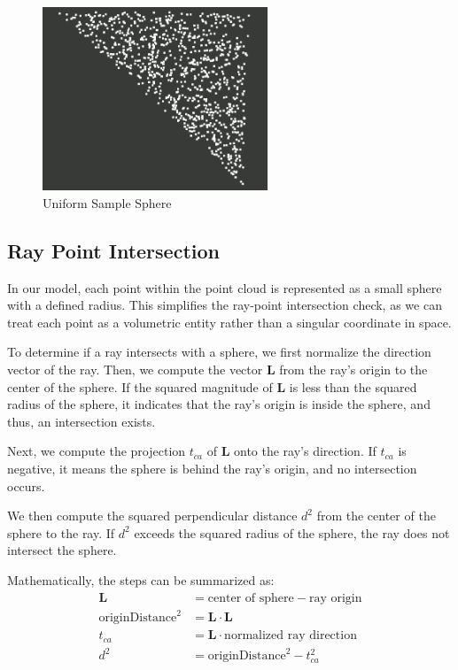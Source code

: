 \documentclass[11pt, a4paper,oneside,chapterprefix=false]{scrbook}
\begin{document}
\begin{minipage}{\textwidth}
	\begin{figure}[H]
		\centering
		\includegraphics*[width=0.6\textwidth]{figures/uniform sample triangle.png}
		\caption{Uniform Sample Sphere}
		\label{fig:uniform sample sphere}
	\end{figure}
\end{minipage}

\subsection{Ray Point Intersection}

In our model, each point within the point cloud is represented as a small sphere with a defined radius. This simplifies the ray-point intersection check, as we can treat each point as a volumetric entity rather than a singular coordinate in space.

To determine if a ray intersects with a sphere, we first normalize the direction vector of the ray. Then, we compute the vector \( \mathbf{L} \) from the ray's origin to the center of the sphere. If the squared magnitude of \( \mathbf{L} \) is less than the squared radius of the sphere, it indicates that the ray's origin is inside the sphere, and thus, an intersection exists.

Next, we compute the projection \( t_{ca} \) of \( \mathbf{L} \) onto the ray's direction. If \( t_{ca} \) is negative, it means the sphere is behind the ray's origin, and no intersection occurs.

We then compute the squared perpendicular distance \( d^2 \) from the center of the sphere to the ray. If \( d^2 \) exceeds the squared radius of the sphere, the ray does not intersect the sphere.

Mathematically, the steps can be summarized as:
\begin{align*}
	\mathbf{L} &= \text{center of sphere} - \text{ray origin} \\
	\text{originDistance}^2 &= \mathbf{L} \cdot \mathbf{L} \\
	t_{ca} &= \mathbf{L} \cdot \text{normalized ray direction} \\
	d^2 &= \text{originDistance}^2 - t_{ca}^2
\end{align*}
\end{document}
